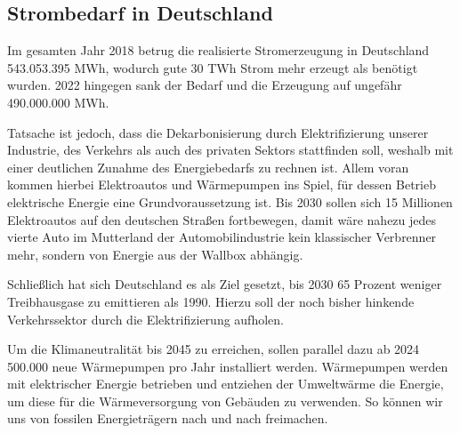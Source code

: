 \documentclass[12pt, a4paper]{article}
\begin{document}
\subsection{Strombedarf in Deutschland}

Im gesamten Jahr 2018 betrug die realisierte Stromerzeugung in Deutschland 543.053.395 MWh, wodurch gute 30 TWh Strom mehr erzeugt als benötigt wurden. 2022 hingegen sank der Bedarf und die Erzeugung auf ungefähr 490.000.000 MWh.


Tatsache ist jedoch, dass die Dekarbonisierung durch Elektrifizierung unserer Industrie, des Verkehrs als auch des privaten Sektors stattfinden soll, weshalb mit einer deutlichen Zunahme des Energiebedarfs zu rechnen ist. Allem voran kommen hierbei Elektroautos und Wärmepumpen ins Spiel, für dessen Betrieb elektrische Energie eine Grundvoraussetzung ist. Bis 2030 sollen sich 15 Millionen Elektroautos auf den deutschen Straßen fortbewegen, damit wäre nahezu jedes vierte Auto im Mutterland der Automobilindustrie kein klassischer Verbrenner mehr, sondern von Energie aus der Wallbox abhängig.


Schließlich hat sich Deutschland es als Ziel gesetzt, bis 2030 65 Prozent weniger Treibhausgase zu emittieren als  1990. Hierzu soll der noch bisher hinkende Verkehrssektor durch die Elektrifizierung aufholen.

Um die Klimaneutralität bis 2045 zu erreichen, sollen parallel dazu ab 2024 500.000 neue Wärmepumpen pro Jahr installiert werden. Wärmepumpen werden mit elektrischer Energie betrieben und entziehen der Umweltwärme die Energie, um diese für die Wärmeversorgung von Gebäuden zu verwenden. So können wir uns von fossilen Energieträgern nach und nach freimachen.
\end{document}
